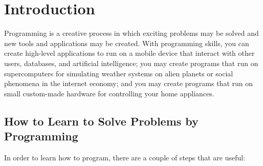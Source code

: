 \documentclass[springer.tex]{subfiles}
\begin{document}
\chapter{Introduction}
\label{chap:introduction}
Programming is a creative process in which exciting problems may be solved and new tools and applications may be created. With programming skills, you can create high-level applications to run on a mobile device that interact with other users, databases, and artificial intelligence; you may create programs that run on supercomputers for simulating weather systems on alien planets or social phenomena in the internet economy; and you may create programs that run on small custom-made hardware for controlling your home appliances. 

\section{How to Learn to Solve Problems by Programming}
In order to learn how to program, there are a couple of steps that are useful:
\end{document}
